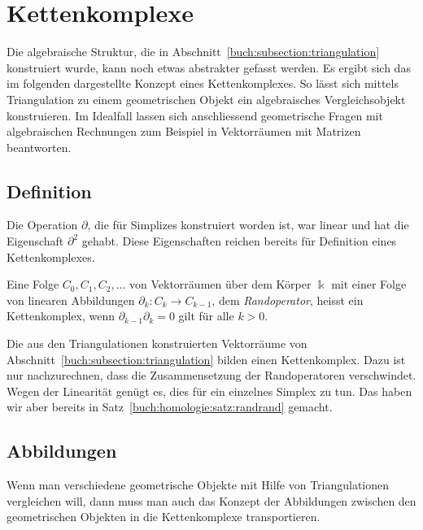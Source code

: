 %
%
%
\section{Kettenkomplexe
\label{buch:section:komplex}}
Die algebraische Struktur, die in Abschnitt~\ref{buch:subsection:triangulation}
konstruiert wurde, kann noch etwas abstrakter gefasst werden.
Es ergibt sich das im folgenden dargestellte Konzept eines Kettenkomplexes.
So lässt sich mittels Triangulation zu einem geometrischen Objekt ein algebraisches 
Vergleichsobjekt konstruieren.
Im Idealfall lassen sich anschliessend geometrische Fragen mit
algebraischen Rechnungen zum Beispiel in Vektorräumen mit Matrizen
beantworten.

\subsection{Definition
\label{buch:subsection:kettenkomplex-definition}}
Die Operation $\partial$, die für Simplizes konstruiert worden ist,
war linear und hat die Eigenschaft $\partial^2$ gehabt.
Diese Eigenschaften reichen bereits für Definition eines Kettenkomplexes.

\begin{definition}
Eine Folge $C_0,C_1,C_2,\dots$ von Vektorräumen über dem Körper $\Bbbk$
mit einer Folge von linearen Abbildungen
$\partial_k\colon C_k \to C_{k-1}$, dem {\em Randoperator},
heisst ein Kettenkomplex, wenn $\partial_{k-1}\partial_k=0$ gilt
für alle $k>0$.
\end{definition}

Die aus den Triangulationen konstruierten Vektorräume von
Abschnitt~\ref{buch:subsection:triangulation} bilden einen
Kettenkomplex.
Dazu ist nur nachzurechnen, dass die Zusammensetzung der
Randoperatoren verschwindet.
Wegen der Linearität genügt es, dies für ein einzelnes Simplex zu tun.
Das haben wir aber bereits in Satz~\ref{buch:homologie:satz:randrand}
gemacht.

\subsection{Abbildungen
\label{buch:subsection:abbildungen}}
Wenn man verschiedene geometrische Objekte mit Hilfe von Triangulationen
vergleichen will, dann muss man auch das Konzept der Abbildungen zwischen
den geometrischen Objekten in die Kettenkomplexe transportieren.

